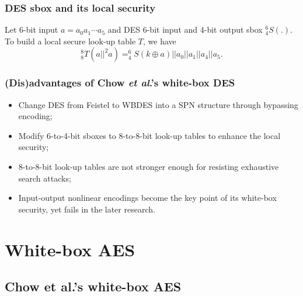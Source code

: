 \documentclass{beamer}
\begin{document}
\frame
{
\frametitle{DES sbox and its local security}
Let $6$-bit input $a=a_{0}a_{1}\cdots a_{5}$ and DES $6$-bit input and $4$-bit output sbox $^{6}_{4}S(.)$. To build a local secure look-up table $T$, we have
\[^{8}_{8}T(a||^{2}a)=^{6}_{4}S(k\oplus a)||a_{0}||a_{1}||a_{4}||a_{5}.\]

\begin{figure}[h]
\centering
{}
\end{figure}
}

\frame
{
\frametitle{(Dis)advantages of Chow \textit{et al}.'s white-box DES}
\begin{itemize}
    \item Change DES from Feistel to WBDES into a SPN structure through bypassing encoding;
    \item Modify 6-to-4-bit sboxes to 8-to-8-bit look-up tables to enhance the local security;
    \item 8-to-8-bit look-up tables are not stronger enough for resisting exhaustive search attacks;
    \item Input-output nonlinear encodings become the key point of its white-box security, yet fails in the later research.
\end{itemize}

}

\section{White-box AES}
\subsection{Chow et al.'s white-box AES}
\end{document}
